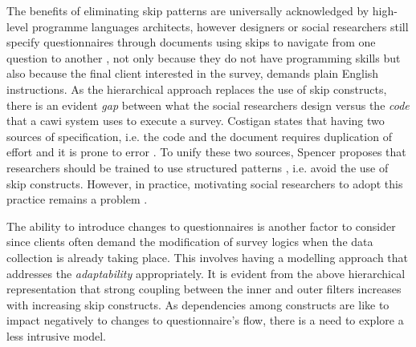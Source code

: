 	The benefits of eliminating skip patterns are universally acknowledged by high-level programme languages architects, however designers or social researchers still specify questionnaires through documents using skips to navigate from one question to another \cite{proc:katz97}, not only because they do not have programming skills but also because the final client interested in the survey, demands plain English instructions. As the hierarchical approach replaces the use of skip constructs, there is an evident \emph{gap} between what the social researchers design versus the \emph{code} that a \gls{cawi} system uses to execute a survey. Costigan states that having two sources of specification, i.e. the code and the document requires duplication of effort and it is prone to error \cite{proc:costigan03}. To unify these two sources, Spencer proposes that researchers should be trained to use structured patterns \cite{web:spencer12}, i.e. avoid the use of skip constructs. However, in practice, motivating social researchers to adopt this practice remains a problem \cite{proc:costigan03}. %

	The ability to introduce changes to questionnaires is another factor to consider since clients often demand the modification of survey logics when the data collection is already taking place. This involves having a modelling approach that addresses the \emph{adaptability} appropriately. It is evident from the above hierarchical representation that strong coupling between the inner and outer filters increases with increasing skip constructs. %
	As dependencies among constructs are like to impact negatively to changes to questionnaire's flow, there is a need to explore a less intrusive model.
	